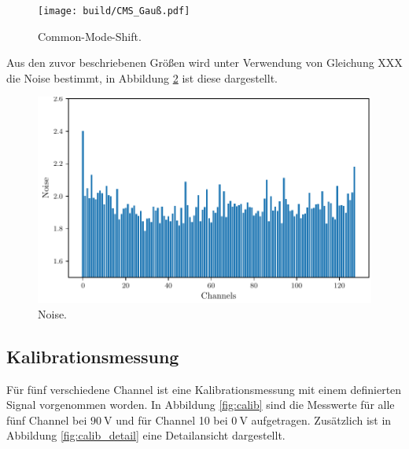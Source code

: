  
\begin{figure}[H]
  \centering
  \texttt{[image: build/CMS\_Gauß.pdf]}
  \caption{Common-Mode-Shift.}
  \label{fig:CMS}
\end{figure}

Aus den zuvor beschriebenen Größen wird unter Verwendung von Gleichung XXX die Noise bestimmt, in Abbildung \ref{fig:noise} ist diese dargestellt.

\begin{figure}[H]
  \centering
  \includegraphics{build/Noise.pdf}
  \caption{Noise.}
  \label{fig:noise}
\end{figure}

\subsection{Kalibrationsmessung}

Für fünf verschiedene Channel ist eine Kalibrationsmessung mit einem definierten Signal vorgenommen worden. In Abbildung \ref{fig:calib} sind die Messwerte für alle fünf Channel bei $\SI{90}{\volt}$ und für Channel 10 bei $\SI{0}{\volt}$ aufgetragen. Zusätzlich ist in Abbildung \ref{fig:calib_detail} eine Detailansicht dargestellt.

